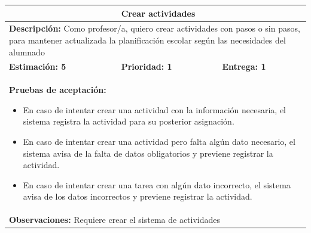 \begin{table}[H]
\centering
{}
\begin{tabularx}{\textwidth}{|X|X|X|}
\hline
\rowcolor{azulclaro}
\multicolumn{1}{|l|}{\textbf{Identificador:} HU-P3} & \multicolumn{2}{l|}{\textbf{Crear actividades}} \\ \hline
\multicolumn{3}{|p{\dimexpr\textwidth-2\tabcolsep-2\arrayrulewidth}|}{\textbf{Descripción:} Como profesor/a, quiero crear actividades con pasos o sin pasos, para mantener actualizada la planificación escolar según las necesidades del alumnado} \\ \hline
\rowcolor{white}
\textbf{Estimación: 5} & \textbf{Prioridad: 1} & \textbf{Entrega: 1} \\ \hline
\multicolumn{3}{|p{\dimexpr\textwidth-2\tabcolsep-2\arrayrulewidth}|}{%
\textbf{Pruebas de aceptación:}
\begin{itemize}[leftmargin=1.5em, itemsep=2pt, topsep=3pt]
    \item En caso de intentar crear una actividad con la información necesaria, el sistema registra la actividad para su posterior asignación.
    \item En caso de intentar crear una actividad pero falta algún dato necesario, el sistema avisa de la falta de datos obligatorios y previene registrar la actividad.
    \item En caso de intentar crear una tarea con algún dato incorrecto, el sistema avisa de los datos incorrectos y previene registrar la actividad.
\end{itemize}
} \\ \hline
\multicolumn{3}{|p{\dimexpr\textwidth-2\tabcolsep-2\arrayrulewidth}|}{\textbf{Observaciones:} Requiere crear el sistema de actividades~} \\ \hline
\end{tabularx}
\end{table}

\vspace{0.4cm}


